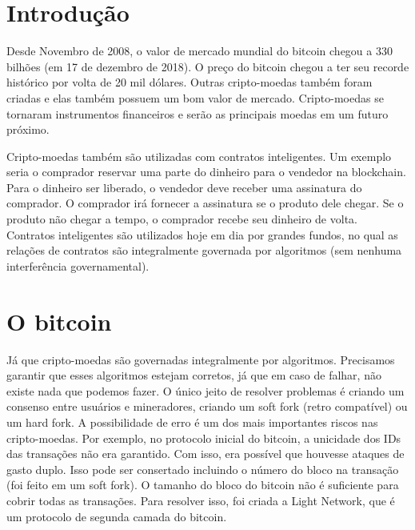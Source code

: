 \documentclass[12pt]{report}
\begin{document}

\tableofcontents
\pagebreak

\renewcommand{\thesection}{\arabic{section}}
\section{Introdução}

Desde Novembro de 2008, o valor de mercado mundial do bitcoin chegou a 330 bilhões (em 17 de dezembro de 2018). O preço do bitcoin chegou a ter seu recorde histórico por volta de 20 mil dólares. Outras cripto-moedas também foram criadas e elas também possuem um bom valor de mercado. Cripto-moedas se tornaram instrumentos financeiros e serão as principais moedas em um futuro próximo.

Cripto-moedas também são utilizadas com contratos inteligentes. Um exemplo seria o comprador reservar uma parte do dinheiro para o vendedor na blockchain. Para o dinheiro ser liberado, o vendedor deve receber uma assinatura do comprador. O comprador irá fornecer a assinatura se o produto dele chegar. Se o produto não chegar a tempo, o comprador recebe seu dinheiro de volta. Contratos inteligentes são utilizados hoje em dia por grandes fundos, no qual as relações de contratos são integralmente governada por algoritmos (sem nenhuma interferência governamental).

\section{O bitcoin}

Já que cripto-moedas são governadas integralmente por algoritmos. Precisamos garantir que esses algoritmos estejam corretos, já que em caso de falhar, não existe nada que podemos fazer. O único jeito de resolver problemas é criando um consenso entre usuários e mineradores, criando um soft fork (retro compatível) ou um hard fork. A possibilidade de erro é um dos mais importantes riscos nas cripto-moedas. Por exemplo, no protocolo inicial do bitcoin, a unicidade dos IDs das transações não era garantido. Com isso, era possível que houvesse ataques de gasto duplo. Isso pode ser consertado incluindo o número do bloco na transação (foi feito em um soft fork). O tamanho do bloco do bitcoin não é suficiente para cobrir todas as transações. Para resolver isso, foi criada a Light Network, que é um protocolo de segunda camada do bitcoin.
\end{document}
